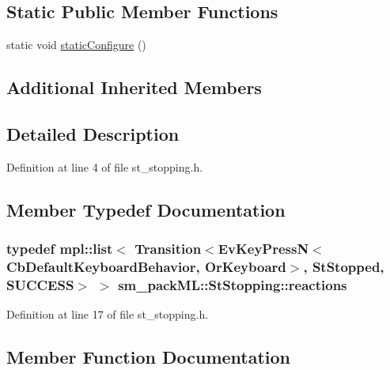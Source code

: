 \subsection*{Static Public Member Functions}
\begin{DoxyCompactItemize}
\item 
static void \hyperlink{structsm__packML_1_1StStopping_a58aa3dd672aeb0496ce2047da298c611}{static\+Configure} ()
\end{DoxyCompactItemize}
\subsection*{Additional Inherited Members}


\subsection{Detailed Description}


Definition at line 4 of file st\+\_\+stopping.\+h.



\subsection{Member Typedef Documentation}
\subsubsection[{\texorpdfstring{reactions}{reactions}}]{\setlength{\rightskip}{0pt plus 5cm}typedef mpl\+::list$<$ Transition$<$Ev\+Key\+PressN$<$Cb\+Default\+Keyboard\+Behavior, {\bf Or\+Keyboard}$>$, {\bf St\+Stopped}, {\bf S\+U\+C\+C\+E\+SS}$>$ $>$ {\bf sm\+\_\+pack\+M\+L\+::\+St\+Stopping\+::reactions}}\hypertarget{structsm__packML_1_1StStopping_af103eed37e68bd7a728c921ec58a2942}{}\label{structsm__packML_1_1StStopping_af103eed37e68bd7a728c921ec58a2942}


Definition at line 17 of file st\+\_\+stopping.\+h.



\subsection{Member Function Documentation}
